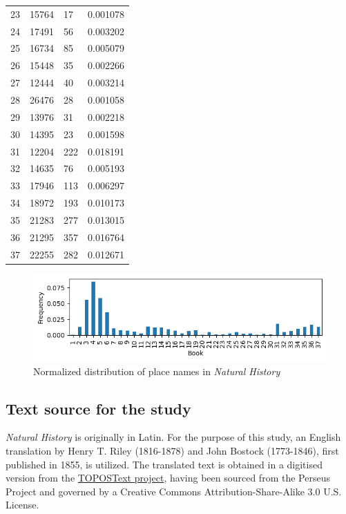 \documentclass[
  12pt,
]{article}
\begin{document}
\begin{longtable}[]{@{}llll@{}}
23 & 15764 & 17 & 0.001078 \\
24 & 17491 & 56 & 0.003202 \\
25 & 16734 & 85 & 0.005079 \\
26 & 15448 & 35 & 0.002266 \\
27 & 12444 & 40 & 0.003214 \\
28 & 26476 & 28 & 0.001058 \\
29 & 13976 & 31 & 0.002218 \\
30 & 14395 & 23 & 0.001598 \\
31 & 12204 & 222 & 0.018191 \\
32 & 14635 & 76 & 0.005193 \\
33 & 17946 & 113 & 0.006297 \\
34 & 18972 & 193 & 0.010173 \\
35 & 21283 & 277 & 0.013015 \\
36 & 21295 & 357 & 0.016764 \\
37 & 22255 & 282 & 0.012671 \\
\end{longtable}

\begin{figure}

{\centering \includegraphics{NHthesis_structure_files/figure-pdf/fig-place_distribution-output-1.png}

}

\caption{\label{fig-place_distribution}Normalized distribution of place
names in \emph{Natural History}}

\end{figure}

\hypertarget{text-source-for-the-study}{%
\subsection{Text source for the study}\label{text-source-for-the-study}}

\emph{Natural History} is originally in Latin. For the purpose of this
study, an English translation by Henry T. Riley (1816-1878) and John
Bostock (1773-1846), first published in 1855, is utilized. The
translated text is obtained in a digitised version from the
\href{https://topostext.org/the-project}{TOPOSText project}, having been
sourced from the Perseus Project and governed by a Creative Commons
Attribution-Share-Alike 3.0 U.S. License.
\end{document}
